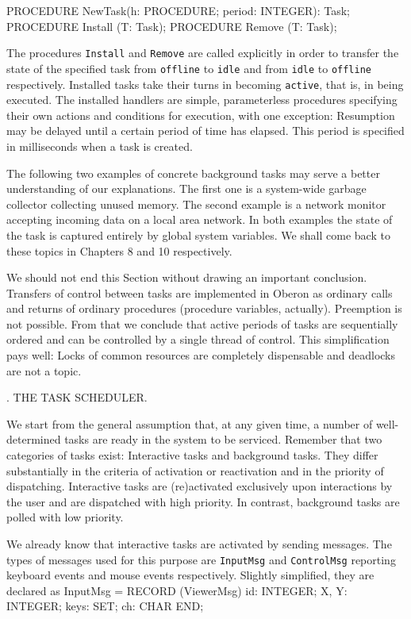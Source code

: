 PROCEDURE NewTask(h: PROCEDURE; period: INTEGER): Task;
PROCEDURE Install (T: Task);
PROCEDURE Remove (T: Task);
\endtt

\noindent The procedures {\tt Install\/} and {\tt Remove\/} are called explicitly in order to
transfer the state of the specified task from {\tt offline\/} to {\tt idle\/} and from
{\tt idle\/} to {\tt offline\/} respectively. Installed tasks take their turns in
becoming {\tt active\/}, that is, in being executed. The installed handlers
are simple, parameterless procedures specifying their own actions and
conditions for execution, with one exception: Resumption may be
delayed until a certain period of time has elapsed. This period is
specified in milliseconds when a task is created.

The following two examples of concrete background tasks may serve a
better understanding of our explanations. The first one is a
system-wide garbage collector collecting unused memory. The second
example is a network monitor accepting incoming data on a local area
network. In both examples the state of the task is captured entirely
by global system variables. We shall come back to these topics in
Chapters 8 and 10 respectively.

We should not end this Section without drawing an important
conclusion. Transfers of control between tasks are implemented in
Oberon as ordinary calls and returns of ordinary procedures (procedure
variables, actually). Preemption is not possible. From that we
conclude that active periods of tasks are sequentially ordered and can
be controlled by a single thread of control. This simplification pays
well: Locks of common resources are completely dispensable and
deadlocks are not a topic.

. THE TASK SCHEDULER.

We start from the general assumption that, at any given time, a number
of well-determined tasks are ready in the system to be
serviced. Remember that two categories of tasks exist: Interactive
tasks and background tasks. They differ substantially in the criteria
of activation or reactivation and in the priority of
dispatching. Interactive tasks are (re)activated exclusively upon
interactions by the user and are dispatched with high priority. In
contrast, background tasks are polled with low priority.

We already know that interactive tasks are activated by sending messages. The types of messages used for this purpose are {\tt InputMsg\/} and {\tt ControlMsg\/} reporting keyboard events and mouse events respectively. Slightly simplified, they are declared as
\begintt
InputMsg = RECORD (ViewerMsg)
  id: INTEGER;
  X, Y: INTEGER;
  keys: SET;
  ch: CHAR
END;


